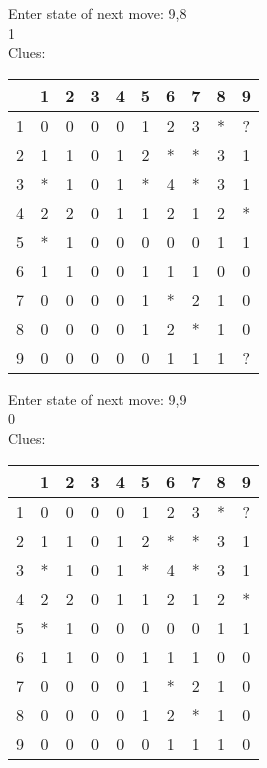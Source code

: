 Enter state of next move: 9,8\\
1\\
Clues:\\
\begin{tabular}{|c|c|c|c|c|c|c|c|c|c|}
\hline
  & 1 & 2 & 3 & 4 & 5 & 6 & 7 & 8 & 9\\
\hline
1 & 0 & 0 & 0 & 0 & 1 & 2 & 3 & * & ?\\
\hline
2 & 1 & 1 & 0 & 1 & 2 & * & * & 3 & 1\\
\hline
3 & * & 1 & 0 & 1 & * & 4 & * & 3 & 1\\
\hline
4 & 2 & 2 & 0 & 1 & 1 & 2 & 1 & 2 & *\\
\hline
5 & * & 1 & 0 & 0 & 0 & 0 & 0 & 1 & 1\\
\hline
6 & 1 & 1 & 0 & 0 & 1 & 1 & 1 & 0 & 0\\
\hline
7 & 0 & 0 & 0 & 0 & 1 & * & 2 & 1 & 0\\
\hline
8 & 0 & 0 & 0 & 0 & 1 & 2 & * & 1 & 0\\
\hline
9 & 0 & 0 & 0 & 0 & 0 & 1 & 1 & 1 & ?\\
\hline
\end{tabular}

Enter state of next move: 9,9\\
0\\
Clues:\\
\begin{tabular}{|c|c|c|c|c|c|c|c|c|c|}
\hline
  & 1 & 2 & 3 & 4 & 5 & 6 & 7 & 8 & 9\\
\hline
1 & 0 & 0 & 0 & 0 & 1 & 2 & 3 & * & ?\\
\hline
2 & 1 & 1 & 0 & 1 & 2 & * & * & 3 & 1\\
\hline
3 & * & 1 & 0 & 1 & * & 4 & * & 3 & 1\\
\hline
4 & 2 & 2 & 0 & 1 & 1 & 2 & 1 & 2 & *\\
\hline
5 & * & 1 & 0 & 0 & 0 & 0 & 0 & 1 & 1\\
\hline
6 & 1 & 1 & 0 & 0 & 1 & 1 & 1 & 0 & 0\\
\hline
7 & 0 & 0 & 0 & 0 & 1 & * & 2 & 1 & 0\\
\hline
8 & 0 & 0 & 0 & 0 & 1 & 2 & * & 1 & 0\\
\hline
9 & 0 & 0 & 0 & 0 & 0 & 1 & 1 & 1 & 0\\
\hline
\end{tabular}

